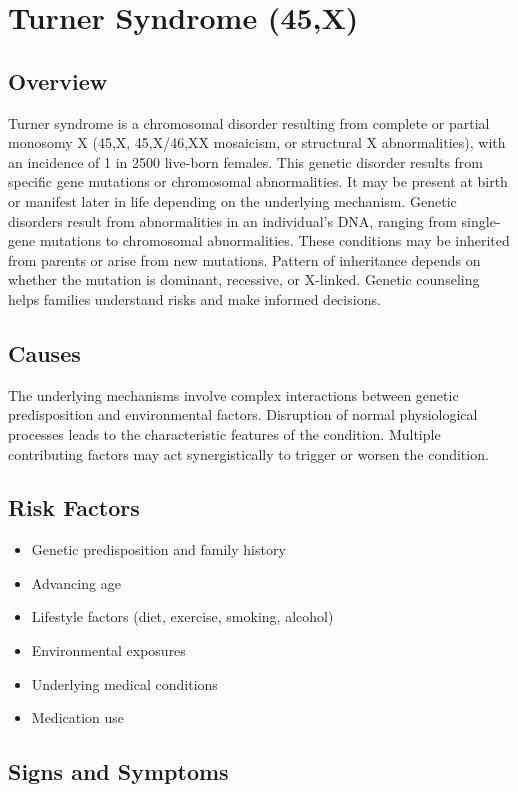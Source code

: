 \chapter{Turner Syndrome (45,X)}
\label{sec:Turner Syndrome}

\section{Overview}
Turner syndrome is a chromosomal disorder resulting from complete or partial monosomy X (45,X, 45,X/46,XX mosaicism, or structural X abnormalities), with an incidence of 1 in 2500 live-born females. This genetic disorder results from specific gene mutations or chromosomal abnormalities. It may be present at birth or manifest later in life depending on the underlying mechanism. Genetic disorders result from abnormalities in an individual's DNA, ranging from single-gene mutations to chromosomal abnormalities. These conditions may be inherited from parents or arise from new mutations. Pattern of inheritance depends on whether the mutation is dominant, recessive, or X-linked. Genetic counseling helps families understand risks and make informed decisions.
\section{Causes}
The underlying mechanisms involve complex interactions between genetic predisposition and environmental factors. Disruption of normal physiological processes leads to the characteristic features of the condition. Multiple contributing factors may act synergistically to trigger or worsen the condition.
\section{Risk Factors}


\begin{itemize}[noitemsep]
  \item Genetic predisposition and family history
  \item Advancing age
  \item Lifestyle factors (diet, exercise, smoking, alcohol)
  \item Environmental exposures
  \item Underlying medical conditions
  \item Medication use
\end{itemize}
\section{Signs and Symptoms}

